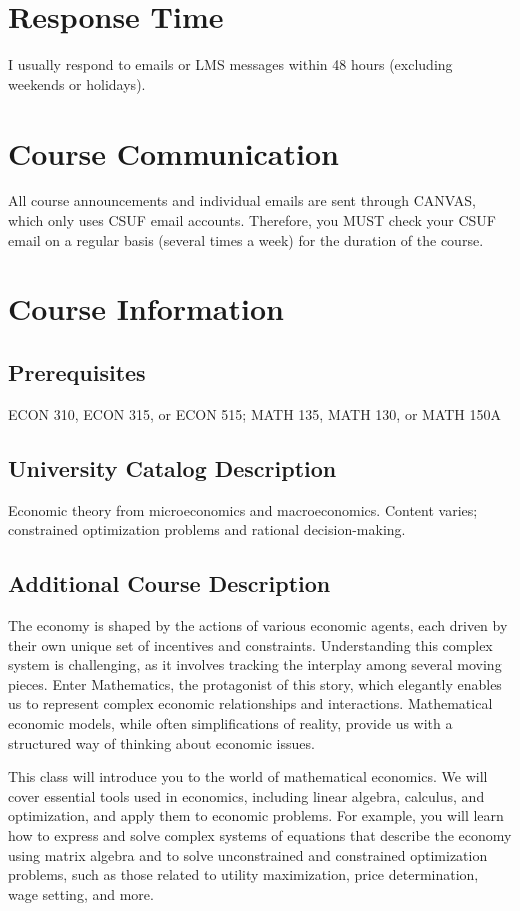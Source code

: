 \documentclass{./../latex/syllabus}
\begin{document}
\section*{Response Time}
I usually respond to emails or LMS messages within 48 hours (excluding weekends or holidays).

\section*{Course Communication}
All course announcements and individual emails are sent through CANVAS, which only uses CSUF email accounts. Therefore, you MUST check your CSUF email on a regular basis (several times a week) for the duration of the course.

\section*{Course Information}

\subsection*{Prerequisites}
ECON 310, ECON 315, or ECON 515; MATH 135, MATH 130, or MATH 150A

\subsection*{University Catalog Description}
Economic theory from microeconomics and macroeconomics. Content varies; constrained optimization problems and rational decision-making.

\subsection*{Additional Course Description}

The economy is shaped by the actions of various economic agents, each driven by their own unique set of incentives and constraints. Understanding this complex system is challenging, as it involves tracking the interplay among several moving pieces. Enter Mathematics, the protagonist of this story, which elegantly enables us to represent complex economic relationships and interactions. Mathematical economic models, while often simplifications of reality, provide us with a structured way of thinking about economic issues.

This class will introduce you to the world of mathematical economics. We will cover essential tools used in economics, including linear algebra, calculus, and optimization, and apply them to economic problems. For example, you will learn how to express and solve complex systems of equations that describe the economy using matrix algebra and to solve unconstrained and constrained optimization problems, such as those related to utility maximization, price determination, wage setting, and more.
\end{document}
